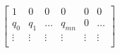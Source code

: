 \documentclass[preview]{standalone}
\begin{document}
\begin{align*}
\begin{bmatrix}1 & 0 & 0 & 0 & 0 & 0 \\q_0 & q_1 & \ldots & q_{mn} & 0 & \ldots \\\vdots & \vdots & \vdots & \vdots & \vdots & \vdots \\\end{bmatrix}
\end{align*}
\end{document}
